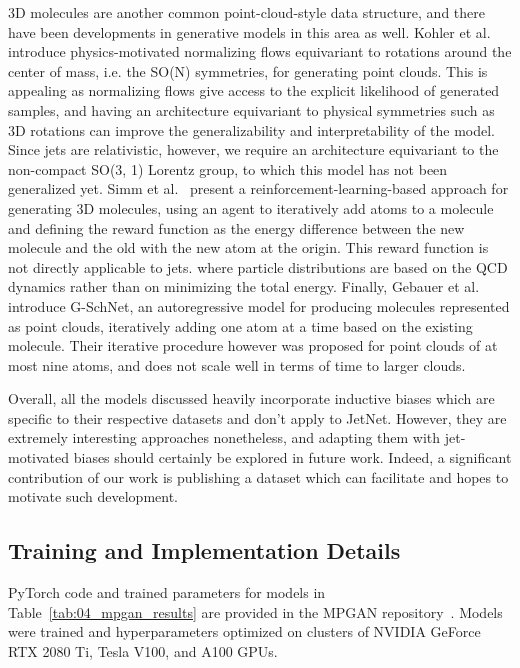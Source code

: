 3D molecules are another common point-cloud-style data structure, and there have been developments in generative models in this area as well.
Kohler et al.~\cite{kohler20} introduce physics-motivated normalizing flows equivariant to rotations around the center of mass, i.e. the SO(N) symmetries, for generating point clouds.
This is appealing as normalizing flows give access to the explicit likelihood of generated samples, and having an architecture equivariant to physical symmetries such as 3D rotations can improve the generalizability and interpretability of the model.
Since jets are relativistic, however, we require an architecture equivariant to the non-compact SO(3, 1) Lorentz group, to which this model has not been generalized yet.
Simm et al.~\cite{simm21} present a reinforcement-learning-based approach for generating 3D molecules, using an agent to iteratively add atoms to a molecule and defining the reward function as the energy difference between the new molecule and the old with the new atom at the origin.
This reward function is not directly applicable to jets. where particle distributions are based on the QCD dynamics rather than on minimizing the total energy.
Finally, Gebauer et al.~\cite{gschnet} introduce G-SchNet, an autoregressive model for producing molecules represented as point clouds, iteratively adding one atom at a time based on the existing molecule.
Their iterative procedure however was proposed for point clouds of at most nine atoms, and does not scale well in terms of time to larger clouds.

Overall, all the models discussed heavily incorporate inductive biases which are specific to their respective datasets and don't apply to JetNet.
However, they are extremely interesting approaches nonetheless, and adapting them with jet-motivated biases should certainly be explored in future work.
Indeed, a significant contribution of our work is publishing a dataset which can facilitate and hopes to motivate such development.

\subsection{Training and Implementation Details}
\label{app:04_mpgan_training}

PyTorch code and trained parameters for models in Table~\ref{tab:04_mpgan_results} are provided in the MPGAN repository~\cite{mpgancode}.
Models were trained and hyperparameters optimized on clusters of NVIDIA GeForce RTX 2080 Ti, Tesla V100, and A100 GPUs.


